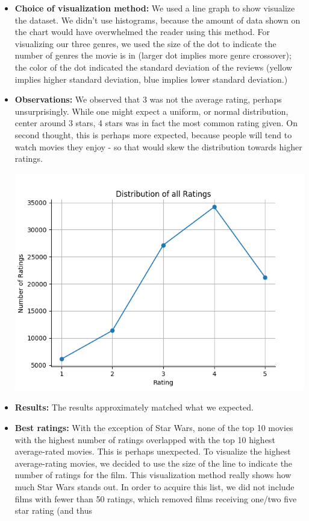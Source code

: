 \begin{itemize}
  \item \textbf{Choice of visualization method:} We used a line graph to show visualize the dataset. We didn't use histograms, because the amount of data shown on the chart would have overwhelmed the reader using this method. For visualizing our three genres, we used the size of the dot to indicate the number of genres the movie is in (larger dot implies more genre crossover); the color of the dot indicated the standard deviation of the reviews (yellow implies higher standard deviation, blue implies lower standard deviation.)
  \item \textbf{Observations:} We observed that 3 was not the average rating, perhaps unsurprisingly. While one might expect a uniform, or normal distribution, center around 3 stars, 4 stars was in fact the most common rating given. On second thought, this is perhaps more expected, because people will tend to watch movies they enjoy - so that would skew the distribution towards higher ratings.
  \begin{center}
    \includegraphics[scale=.6]{basic_1.png}
  \end{center}
  \item \textbf{Results:} The results approximately matched what we expected.
  \item \textbf{Best ratings:} With the exception of Star Wars, none of the top 10 movies with the highest number of ratings overlapped with the top 10 highest average-rated movies. This is perhaps unexpected. To visualize the highest average-rating movies, we decided to use the size of the line to indicate the number of ratings for the film. This visualization method really shows how much Star Wars stands out. In order to acquire this list, we did not include films with fewer than 50 ratings, which removed films receiving one/two five star rating (and thus

\end{itemize}
